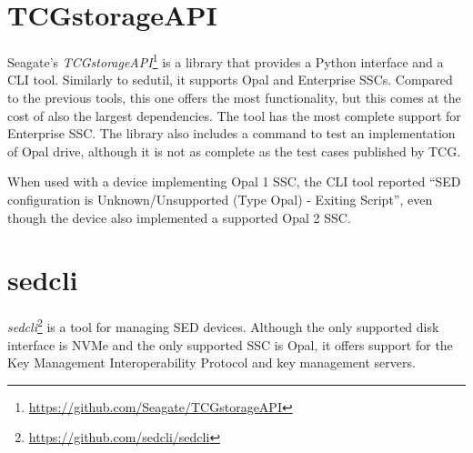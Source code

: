 
\section{TCGstorageAPI}

Seagate's \emph{TCGstorageAPI}\footnote{\url{https://github.com/Seagate/TCGstorageAPI}} is a library that provides a Python interface and a CLI tool. Similarly to sedutil, it supports Opal and Enterprise SSCs.
Compared to the previous tools, this one offers the most functionality, but this comes at the cost of also the largest dependencies. The tool has the most complete support for Enterprise SSC.
The library also includes a command to test an implementation of Opal drive, although it is not as complete as the test cases published by TCG.


When used with a device implementing Opal 1 SSC, the CLI tool reported ``SED configuration is Unknown/Unsupported (Type Opal) - Exiting Script'', even though the device also implemented a supported Opal 2 SSC.





\section{sedcli}

\emph{sedcli}\footnote{\url{https://github.com/sedcli/sedcli}} is a tool for managing SED devices. Although the only supported disk interface is NVMe and the only supported SSC is Opal, it offers support for the Key Management Interoperability Protocol and key management servers.

